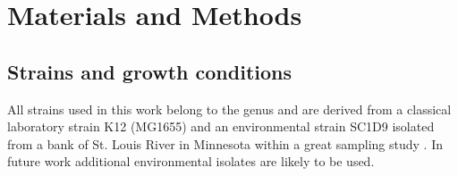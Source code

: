 \chapter{Materials and Methods}



\shorthandoff{-} 

\section{Strains and growth conditions}
All strains used in this work belong to the genus  and are derived from a classical laboratory strain K12 (MG1655) and an environmental strain SC1\textunderscore D9 isolated from a bank of St. Louis River in Minnesota within a great sampling study \cite{ishii2006presence}.
In future work additional environmental isolates are likely to be used.

